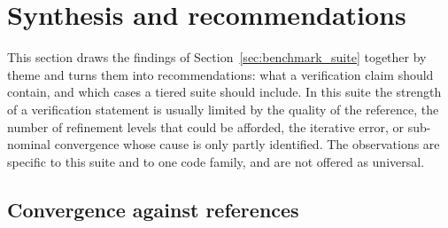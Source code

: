 \section{Synthesis and recommendations}\label{sec:synthesis}


This section draws the findings of Section~\ref{sec:benchmark_suite} together by theme and turns them into recommendations: what a verification claim should contain, and which cases a tiered suite should include.
In this suite the strength of a verification statement is usually limited by the quality of the reference, the number of refinement levels that could be afforded, the iterative error, or sub-nominal convergence whose cause is only partly identified.
The observations are specific to this suite and to one code family, and are not offered as universal.

\subsection{Convergence against references}\label{sec:cross_convergence}\label{sec:qoi_dependence}

